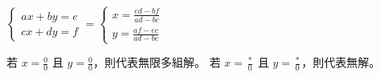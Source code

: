 $\begin{cases}ax+by=e\\cx+dy=f\end{cases} = \begin{cases}x = \frac{ed-bf}{ad-bc}\\y = \frac{af-ec}{ad-bc}\end{cases}$

若 $x = \frac{0}{0}$ 且 $y = \frac{0}{0}$，則代表無限多組解。
若 $x = \frac{*}{0}$ 且 $y = \frac{*}{0}$，則代表無解。
